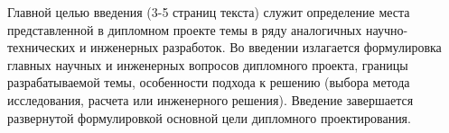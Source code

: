 Главной целью введения (3-5 страниц текста) служит определение места представленной в
дипломном проекте темы в ряду аналогичных научно-технических и инженерных разработок. Во
введении излагается формулировка главных научных и инженерных вопросов дипломного проекта,
границы разрабатываемой темы, особенности подхода к решению (выбора метода исследования,
расчета или инженерного решения). Введение завершается развернутой формулировкой основной
цели дипломного проектирования.
